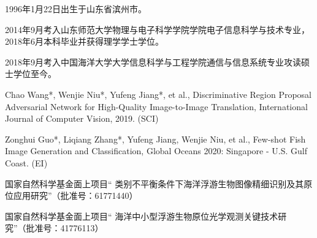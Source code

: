 \begin{resume}


  1996年1月22日出生于山东省滨州市。

  2014年9月考入山东师范大学物理与电子科学学院学院电子信息科学与技术专业，2018年6月本科毕业并获得理学学士学位。
  
  2018年9月考入中国海洋大学大学信息科学与工程学院通信与信息系统专业攻读硕士学位至今。


  \begin{publications}
    \item Chao Wang*, Wenjie Niu*, Yufeng Jiang*, et al., Discriminative Region Proposal Adversarial Network for High-Quality Image-to-Image Translation, International Journal of Computer Vision, 2019. (SCI)
    \item Zonghui Guo*, Liqiang Zhang*, Yufeng Jiang, Wenjie Niu, et al., Few-shot Fish Image Generation and Classification, Global Oceans 2020: Singapore - U.S. Gulf Coast. (EI) 
  \end{publications}

  \begin{achievements}
    \item 国家自然科学基金面上项目“ 类别不平衡条件下海洋浮游生物图像精细识别及其原位应用研究”（批准号：61771440）
    \item 国家自然科学基金面上项目“ 海洋中小型浮游生物原位光学观测关键技术研究”（批准号：41776113）

  \end{achievements}

\end{resume}
